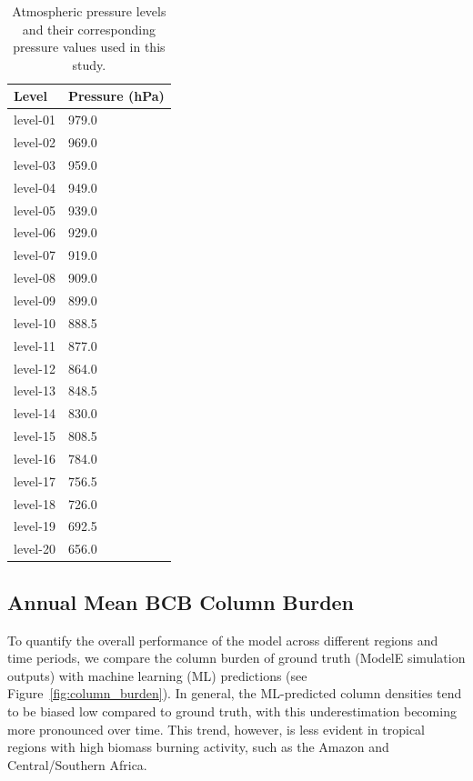 \documentclass{article}
\begin{document}
    \begin{table}[htbp]
        \centering
        \caption{Atmospheric pressure levels and their corresponding pressure values used in this study.}
        \label{tab:pressure_levels}
        \begin{tabular}{ll}
        \hline
        Level & Pressure (hPa) \\
        \hline
        level-01  & 979.0 \\
        level-02  & 969.0 \\
        level-03  & 959.0 \\
        level-04  & 949.0 \\
        level-05  & 939.0 \\
        level-06  & 929.0 \\
        level-07  & 919.0 \\
        level-08  & 909.0 \\
        level-09  & 899.0 \\
        level-10 & 888.5 \\
        level-11 & 877.0 \\
        level-12 & 864.0 \\
        level-13 & 848.5 \\
        level-14 & 830.0 \\
        level-15 & 808.5 \\
        level-16 & 784.0 \\
        level-17 & 756.5 \\
        level-18 & 726.0 \\
        level-19 & 692.5 \\
        level-20 & 656.0 \\
        \hline
        \end{tabular}
    \end{table}
    


    \subsection{Annual Mean BCB Column Burden}
    To quantify the overall performance of the model across different regions and time periods, we compare the column burden of ground truth (ModelE simulation outputs) with machine learning (ML) predictions (see Figure~\ref{fig:column_burden}). In general, the ML-predicted column densities tend to be biased low compared to ground truth, with this underestimation becoming more pronounced over time. This trend, however, is less evident in tropical regions with high biomass burning activity, such as the Amazon and Central/Southern Africa.
\end{document}
